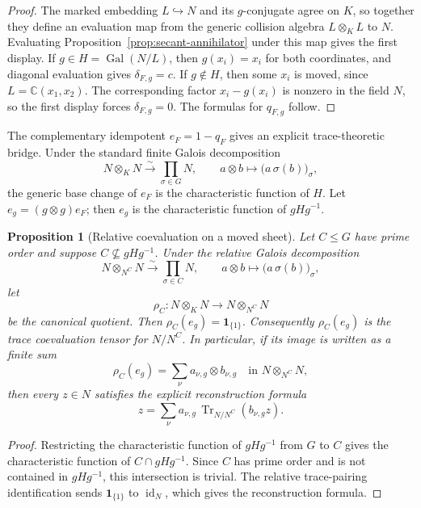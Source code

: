 \documentclass[11pt]{article}
\newtheorem{proposition}[theorem]{Proposition}
\theoremstyle{remark}
\theoremstyle{definition}
\DeclareMathOperator{\Gal}{Gal}
\newcommand{\C}{\mathbb C}
\begin{document}
\begin{proof}
The marked embedding \(L\hookrightarrow N\) and its \(g\)-conjugate agree
on \(K\), so together they define an evaluation map from the generic
collision algebra \(L\otimes_KL\) to \(N\).  Evaluating
Proposition~\ref{prop:secant-annihilator} under this map gives the first
display.  If \(g\in H=\Gal(N/L)\), then \(g(x_i)=x_i\) for both coordinates,
and diagonal evaluation gives \(\delta_{F,g}=c\).  If \(g\notin H\), then
some \(x_i\) is moved, since \(L=\C(x_1,x_2)\).  The corresponding factor
\(x_i-g(x_i)\) is nonzero in the field \(N\), so the first display forces
\(\delta_{F,g}=0\).  The formulas for \(q_{F,g}\) follow.
\end{proof}

The complementary idempotent \(e_F=1-q_F\) gives an explicit
trace-theoretic bridge.  Under the standard finite Galois decomposition
\[
  N\otimes_KN\xrightarrow{\sim}\prod_{\sigma\in G}N,
  \qquad
  a\otimes b\longmapsto\bigl(a\,\sigma(b)\bigr)_{\sigma},
\]
the generic base change of \(e_F\) is the characteristic function of
\(H\).  Let \(e_g=(g\otimes g)e_F\); then \(e_g\) is the characteristic
function of \(gHg^{-1}\).

\begin{proposition}[Relative coevaluation on a moved sheet]
\label{prop:relative-coevaluation-moved-sheet}
Let \(C\leq G\) have prime order and suppose
\(C\nsubseteq gHg^{-1}\).  Under the relative Galois decomposition
\[
  N\otimes_{N^C}N\xrightarrow{\sim}\prod_{\sigma\in C}N,
  \qquad
  a\otimes b\longmapsto\bigl(a\,\sigma(b)\bigr)_{\sigma},
\]
let
\[
  \rho_C:N\otimes_KN\longrightarrow N\otimes_{N^C}N
\]
be the canonical quotient.  Then
\(\rho_C(e_g)=\mathbf1_{\{1\}}\).  Consequently \(\rho_C(e_g)\) is the
trace coevaluation tensor for \(N/N^C\).  In particular, if its image is
written as a finite sum
\[
  \rho_C(e_g)=\sum_\nu a_{\nu,g}\otimes b_{\nu,g}
  \quad\text{in }N\otimes_{N^C}N,
\]
then every \(z\in N\) satisfies the explicit reconstruction formula
\[
  z=\sum_\nu a_{\nu,g}\,
       \operatorname{Tr}_{N/N^C}(b_{\nu,g}z).
\]
\end{proposition}

\begin{proof}
Restricting the characteristic function of \(gHg^{-1}\) from \(G\) to
\(C\) gives the characteristic function of
\(C\cap gHg^{-1}\).  Since \(C\) has prime order and is not contained in
\(gHg^{-1}\), this intersection is trivial.  The relative trace-pairing
identification sends \(\mathbf1_{\{1\}}\) to \(\operatorname{id}_N\),
which gives the reconstruction formula.
\end{proof}
\end{document}
